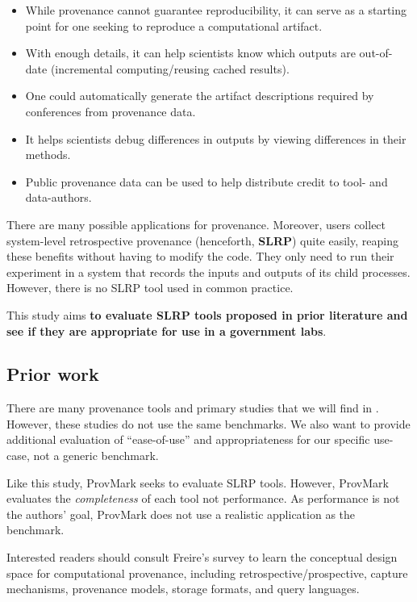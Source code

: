 \begin{itemize}
\item
While provenance cannot guarantee reproducibility, it can serve as a starting point for one seeking to reproduce a computational artifact.

\item
With enough details, it can help scientists know which outputs are out-of-date (incremental computing/reusing cached results).

\item
One could automatically generate the artifact descriptions required by conferences from provenance data.

\item
It helps scientists debug differences in outputs by viewing differences in their methods.

\item
Public provenance data can be used to help distribute credit to tool- and data-authors.
\end{itemize}

There are many possible applications for provenance.
Moreover, users collect system-level retrospective provenance (henceforth, \textbf{SLRP}) quite easily, reaping these benefits without having to modify the code.
They only need to run their experiment in a system that records the inputs and outputs of its child processes.
However, there is no SLRP tool used in common practice.

This study aims \textbf{to evaluate SLRP tools proposed in prior literature and see if they are appropriate for use in a government labs}.

\subsection{Prior work}

There are many provenance tools and primary studies that we will find in .
However, these studies do not use the same benchmarks.
We also want to provide additional evaluation of ``ease-of-use'' and appropriateness for our specific use-case, not a generic benchmark.

Like this study, ProvMark \cite{chan_provmark_2019} seeks to evaluate SLRP tools.
However, ProvMark evaluates the \emph{completeness} of each tool not performance.
As performance is not the authors' goal, ProvMark does not use a realistic application as the benchmark.

Interested readers should consult Freire's survey \cite{freire_provenance_2008} to learn the conceptual design space for computational provenance, including retrospective/prospective, capture mechanisms, provenance models, storage formats, and query languages.

